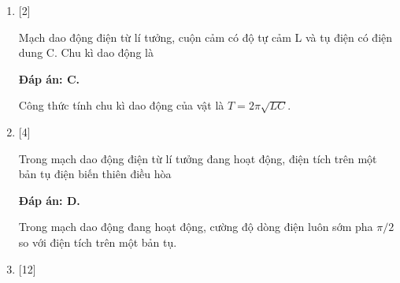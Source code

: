 \begin{enumerate}[label=\bfseries Câu \arabic*:]
	\item {} [2] %
	
	{Mạch dao động điện từ lí tưởng, cuộn cảm có độ tự cảm L và tụ điện có điện dung C. Chu kì dao động là
	}
	
	\hideall
	{		\textbf{Đáp án: C.}
		
		Công thức  tính chu kì dao động của vật là $T = 2\pi \sqrt{LC}$.
		
	}
	
	\item {} [4] %
	
	{Trong mạch dao động điện từ lí tưởng đang hoạt động, điện tích trên một bản tụ điện biến thiên điều hòa
	}
	
	\hideall
	{		\textbf{Đáp án: D.}
		
		Trong mạch dao động đang hoạt động, cường độ dòng điện luôn sớm pha $\pi /2$ so với điện tích trên một bản tụ.
		
	}
	
	\item {} [12] %
	

\end{enumerate}
